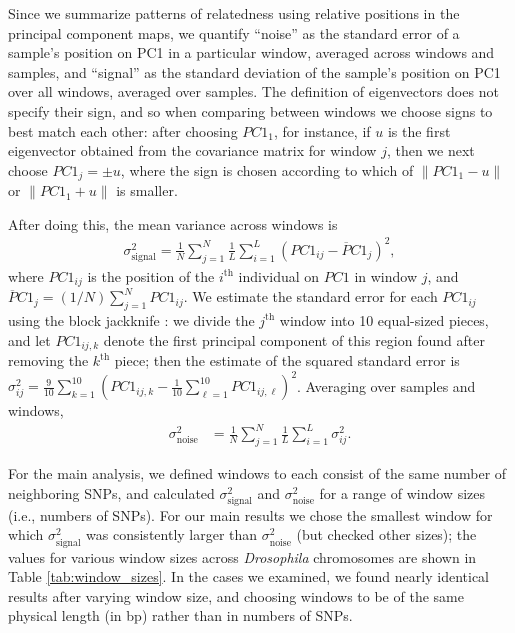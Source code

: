 \documentclass[11pt, oneside]{article}   	%
\newcommand\citep{\cite}
\newcommand{\pcone}{PC1}
\renewcommand{\revpoint}[2]{\relax}
\renewcommand{\llabel}[1]{\relax}
\begin{document}
Since we summarize patterns of relatedness using relative positions in the principal component maps,
we quantify ``noise'' as the standard error of a sample's position on PC1 in a particular window,
averaged across windows and samples,
and ``signal'' as the standard deviation of the sample's position on PC1 over all windows,
averaged over samples. \revpoint{2}{11}
The definition of eigenvectors does not specify their sign,
and so when comparing between windows we choose signs to best match each other:
after choosing $\pcone_1$, for instance, 
if $u$ is the first eigenvector obtained from the covariance matrix
for window $j$,
then we next choose $\pcone_j = \pm u$,
where the sign is chosen according to which of 
$\| \pcone_{1} - u \|$ or
$\| \pcone_{1} + u \|$ 
is smaller.
\llabel{ll:moved_pc_note}

After doing this, the mean variance across windows is
\begin{align*}
    \sigma_\text{signal}^2
    = 
    \frac{1}{N} \sum_{j=1}^{N}
        \frac{1}{L}\sum_{i=1}^{L}\left ( \pcone_{ij} -\overline\pcone_{j} \right )^{2} ,
\end{align*}
where $\pcone_{ij}$ is the position of the $i^\text{th}$ individual on $\pcone$ in window $j$,
and $\overline\pcone_j = (1/N) \sum_{j=1}^N \pcone_{ij}$.
We estimate the standard error for each $\pcone_{ij}$ using the block jackknife \citep{efron1982jackknife,busing1999deletem}: \revpoint{2}{5}
we divide the $j^\text{th}$ window into 10 equal-sized pieces,
and let $\pcone_{ij,k}$ denote the first principal component of this region found after removing the $k^\text{th}$ piece;
then the estimate of the squared standard error is
$\sigma^2_{ij} = \frac{9}{10} \sum_{k=1}^{10} ( \pcone_{ij,k} - \frac{1}{10} \sum_{\ell=1}^{10} \pcone_{ij,\ell} )^2$.
Averaging over samples and windows,
\begin{align*}
    \sigma^2_\text{noise}
    &=
    \frac{1}{N} \sum_{j=1}^{N} \frac{1}{L}\sum_{i=1}^{L} \sigma^2_{ij} .
\end{align*}

For the main analysis, we defined windows to each consist of the same number of neighboring SNPs,
and calculated $\sigma^2_\text{signal}$ and $\sigma^2_\text{noise}$
for a range of window sizes (i.e., numbers of SNPs).
For our main results we
chose the smallest window for which $\sigma^2_\text{signal}$ was consistently larger than $\sigma^2_\text{noise}$ (but checked other sizes);
the values for various window sizes across \textit{Drosophila} chromosomes are shown in Table \ref{tab:window_sizes}.
In the cases we examined, we found nearly identical results after varying window size,
and choosing windows to be of the same physical length (in bp) rather than in numbers of SNPs.
\end{document}

